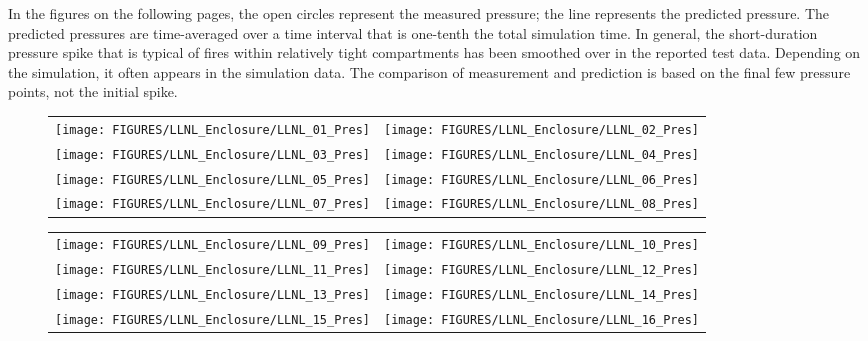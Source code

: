 In the figures on the following pages, the open circles represent the measured pressure; the line represents the predicted pressure. The
predicted pressures are time-averaged over a time interval that is one-tenth the total simulation time. In general, the short-duration pressure
spike that is typical of fires within relatively tight compartments has been smoothed over in the reported test data. Depending on the simulation, it
often appears in the simulation data. The comparison of measurement and prediction is based on the final few pressure points, not the
initial spike.

\begin{figure}[p]
\begin{tabular*}{\textwidth}{l@{\extracolsep{\fill}}r}
\texttt{[image: FIGURES/LLNL\_Enclosure/LLNL\_01\_Pres]} &
\texttt{[image: FIGURES/LLNL\_Enclosure/LLNL\_02\_Pres]} \\
\texttt{[image: FIGURES/LLNL\_Enclosure/LLNL\_03\_Pres]} &
\texttt{[image: FIGURES/LLNL\_Enclosure/LLNL\_04\_Pres]} \\
\texttt{[image: FIGURES/LLNL\_Enclosure/LLNL\_05\_Pres]} &
\texttt{[image: FIGURES/LLNL\_Enclosure/LLNL\_06\_Pres]} \\
\texttt{[image: FIGURES/LLNL\_Enclosure/LLNL\_07\_Pres]} &
\texttt{[image: FIGURES/LLNL\_Enclosure/LLNL\_08\_Pres]}
\end{tabular*}
\label{LLNL_Enclosure_Pres_1}
\end{figure}

\begin{figure}[p]
\begin{tabular*}{\textwidth}{l@{\extracolsep{\fill}}r}
\texttt{[image: FIGURES/LLNL\_Enclosure/LLNL\_09\_Pres]} &
\texttt{[image: FIGURES/LLNL\_Enclosure/LLNL\_10\_Pres]} \\
\texttt{[image: FIGURES/LLNL\_Enclosure/LLNL\_11\_Pres]} &
\texttt{[image: FIGURES/LLNL\_Enclosure/LLNL\_12\_Pres]} \\
\texttt{[image: FIGURES/LLNL\_Enclosure/LLNL\_13\_Pres]} &
\texttt{[image: FIGURES/LLNL\_Enclosure/LLNL\_14\_Pres]} \\
\texttt{[image: FIGURES/LLNL\_Enclosure/LLNL\_15\_Pres]} &
\texttt{[image: FIGURES/LLNL\_Enclosure/LLNL\_16\_Pres]}
\end{tabular*}
\label{LLNL_Enclosure_Pres_2}
\end{figure}

